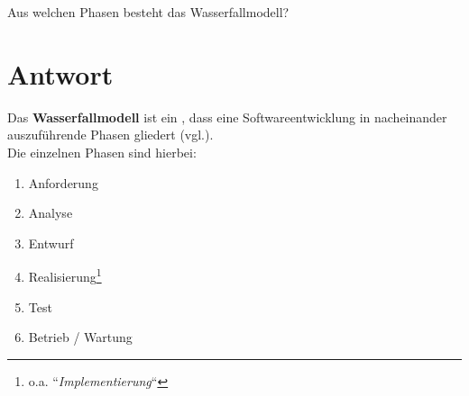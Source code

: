 Aus welchen Phasen besteht das Wasserfallmodell?


\section*{Antwort}
Das \textbf{Wasserfallmodell} ist ein , dass eine Softwareentwicklung in nacheinander auszuführende Phasen gliedert (vgl.\cite[518, 519]{Bal08}).\\

\noindent
Die einzelnen Phasen sind hierbei:

\begin{enumerate}
    \item Anforderung
    \item Analyse
    \item Entwurf
    \item Realisierung\footnote{o.a. ``\textit{Implementierung}``}
    \item Test
    \item Betrieb / Wartung
\end{enumerate}
